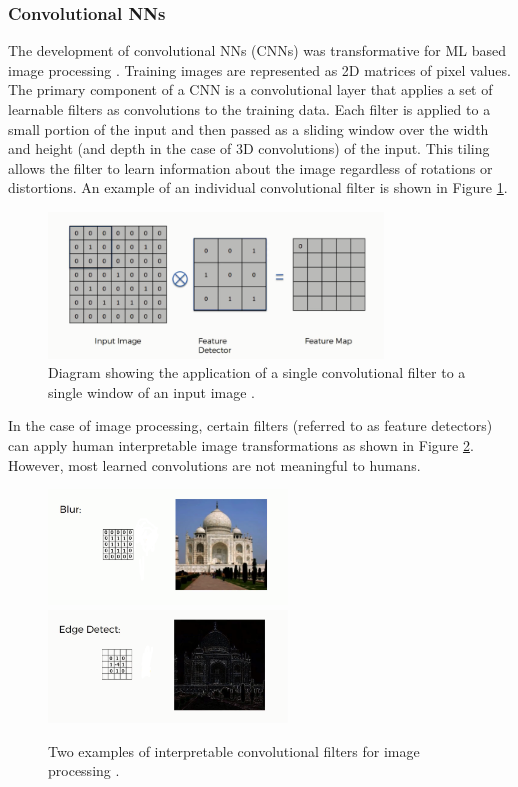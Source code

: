 \subsubsection{Convolutional NNs}
The development of convolutional NNs (CNNs) was transformative for ML based image processing \cite{cnn_paper}. Training images are represented as 2D matrices of pixel values. The primary component of a CNN is a convolutional layer that applies a set of learnable filters as convolutions to the training data. Each filter is applied to a small portion of the input and then passed as a sliding window over the width and height (and depth in the case of 3D convolutions) of the input. This tiling allows the filter to learn information about the image regardless of rotations or distortions. An example of an individual convolutional filter is shown in Figure \ref{fig:conv}.\\

\begin{figure}[htb!]
    \centering
    \includegraphics[width=3.5in]{figures/chapter4/convolution.png}
    \caption{Diagram showing the application of a single convolutional filter to a single window of an input image \cite{cnn_blog}.}
    \label{fig:conv}
\end{figure}

In the case of image processing, certain filters (referred to as feature detectors) can apply human interpretable image transformations as shown in Figure \ref{fig:ex_convs}. However, most learned convolutions are not meaningful to humans.\\

\begin{figure}[htb!]
    \centering
    \includegraphics[width=2.5in]{figures/chapter4/blur_filter.png}\\
    \includegraphics[width=2.5in]{figures/chapter4/edge_filter.png}
    \caption{Two examples of interpretable convolutional filters for image processing \cite{cnn_blog}.}
    \label{fig:ex_convs}
\end{figure}

